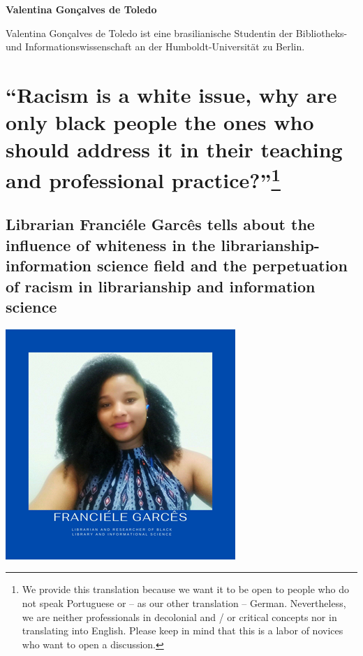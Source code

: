 \documentclass[a4paper,
fontsize=11pt,
oneside,
numbers=noperiodatend,
parskip=half-,
bibliography=totoc,
final
]{scrartcl}
\begin{document}
\textbf{Valentina Gonçalves de Toledo}

Valentina Gonçalves de Toledo ist eine brasilianische Studentin der
Bibliotheks- und Informationswissenschaft an der Humboldt-Universität zu
Berlin.

\pagebreak

\hypertarget{racism-is-a-white-issue-why-are-only-black-people-the-ones-who-should-address-it-in-their-teaching-and-professional-practice15}{%
\section[\enquote{Racism is a white issue, why are only black people
the ones who should address it in their teaching and professional
practice?}]{\texorpdfstring{\enquote{Racism is a white issue, why are
only black people the ones who should address it in their teaching and
professional
practice?}\footnote{We provide this translation because we want it to be
  open to people who do not speak Portuguese or -- as our other
  translation -- German. Nevertheless, we are neither professionals in
  decolonial and / or critical concepts nor in translating into English.
  Please keep in mind that this is a labor of novices who want to open a
  discussion.}}{``Racism is a white issue, why are only black people the ones who should address it in their teaching and professional practice?''}}\label{racism-is-a-white-issue-why-are-only-black-people-the-ones-who-should-address-it-in-their-teaching-and-professional-practice15}}

\hypertarget{librarian-franciuxe9le-garcuxeas-tells-about-the-influence-of-whiteness-in-the-librarianship-information-science-field-and-the-perpetuation-of-racism-in-librarianship-and-information-science}{%
\subsection{Librarian Franciéle Garcês tells about the influence of
whiteness in the librarianship-information science field and the
perpetuation of racism in librarianship and information
science}\label{librarian-franciuxe9le-garcuxeas-tells-about-the-influence-of-whiteness-in-the-librarianship-information-science-field-and-the-perpetuation-of-racism-in-librarianship-and-information-science}}

\begin{center}
\includegraphics{img/img1.PNG}
\end{center}
\end{document}
